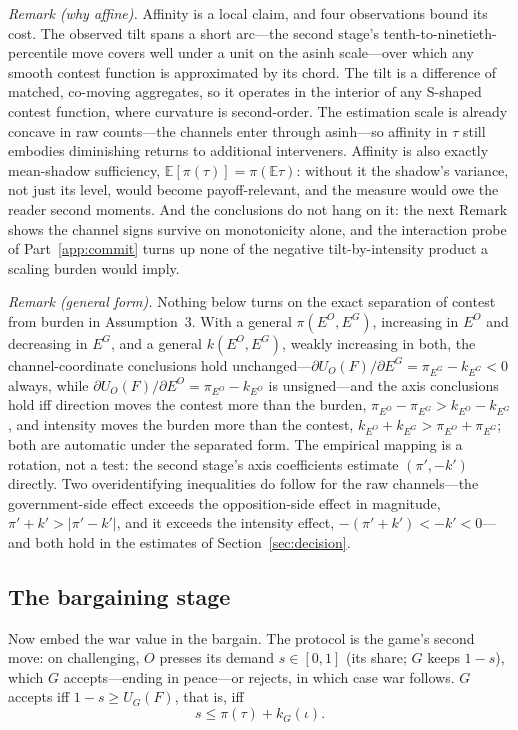 \emph{Remark (why affine).}  Affinity is a local claim, and four observations
bound its cost.  The observed tilt spans a short arc---the second stage's
tenth-to-ninetieth-percentile move covers well under a unit on the asinh
scale---over which any smooth contest function is approximated by its chord.
The tilt is a difference of matched, co-moving aggregates, so it operates in
the interior of any S-shaped contest function, where curvature is
second-order.  The estimation scale is already concave in raw counts---the
channels enter through asinh---so affinity in $\tau$ still embodies
diminishing returns to additional interveners.  Affinity is also exactly
mean-shadow sufficiency, $\mathbb{E}[\pi(\tau)] = \pi(\mathbb{E}\tau)$:
without it the shadow's variance, not just its level, would become
payoff-relevant, and the measure would owe the reader second moments.  And
the conclusions do not hang on it: the next Remark shows the channel signs
survive on monotonicity alone, and the interaction probe of
Part~\ref{app:commit} turns up none of the negative tilt-by-intensity product a
scaling burden would imply.

\emph{Remark (general form).}  Nothing below turns on the exact separation of
contest from burden in Assumption~3.  With a general $\pi(E^O, E^G)$, increasing in $E^O$ and
decreasing in $E^G$, and a general $k(E^O, E^G)$, weakly increasing in both,
the channel-coordinate conclusions hold unchanged---$\partial U_O(F)/\partial
E^G = \pi_{E^G} - k_{E^G} < 0$ always, while $\partial U_O(F)/\partial E^O =
\pi_{E^O} - k_{E^O}$ is unsigned---and the axis conclusions hold iff direction
moves the contest more than the burden, $\pi_{E^O} - \pi_{E^G} > k_{E^O} -
k_{E^G}$, and intensity moves the burden more than the contest, $k_{E^O} +
k_{E^G} > \pi_{E^O} + \pi_{E^G}$; both are automatic under the separated form.
The empirical mapping is a rotation, not a test: the second stage's axis
coefficients estimate $(\pi', -k')$ directly.  Two overidentifying
inequalities do follow for the raw channels---the government-side effect
exceeds the opposition-side effect in magnitude, $\pi' + k' > |\pi' - k'|$,
and it exceeds the intensity effect, $-(\pi' + k') < -k' < 0$---and both hold
in the estimates of Section~\ref{sec:decision}.

\subsection{The bargaining stage}
\label{app:bargain}

Now embed the war value in the bargain.  The protocol is the game's second
move: on challenging, $O$ presses its demand $s \in [0,1]$ (its share; $G$
keeps $1 - s$), which $G$ accepts---ending in peace---or rejects, in which
case war follows.  $G$ accepts iff $1 - s \ge U_G(F)$, that is, iff
\begin{equation}
  s \le \pi(\tau) + k_G(\iota). \label{eq:accept}
\end{equation}


